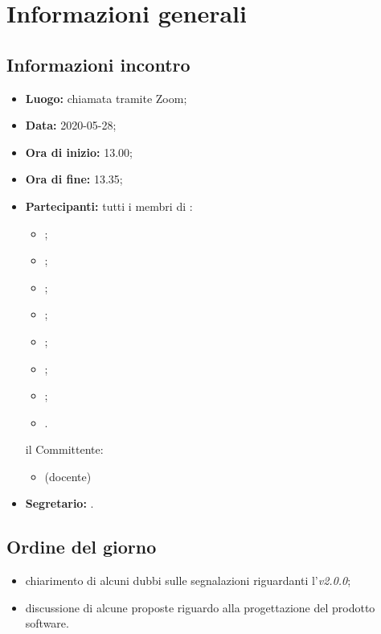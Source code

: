 \section{Informazioni generali}
\subsection{Informazioni incontro}
\begin{itemize}
	\item \textbf{Luogo:} chiamata tramite Zoom;
	\item \textbf{Data:} 2020-05-28;
	\item \textbf{Ora di inizio:} 13.00;
	\item \textbf{Ora di fine:} 13.35;
	\item \textbf{Partecipanti:}
		tutti i membri di \Gruppo:
		\begin{itemize}
			\item \VB;
			\item \LB;
			\item \NF;
			\item \EG;
			\item \FJ;
			\item \MP;
			\item \AS;
			\item \AZ.
		\end{itemize}
		il Committente:
		\begin{itemize}
			\item \RC{} (docente)
		\end{itemize}
	\item \textbf{Segretario:} \MP.
\end{itemize}

\subsection{Ordine del giorno}
\begin{itemize}
	\item chiarimento di alcuni dubbi sulle segnalazioni riguardanti l'\AdR{}\textit{v2.0.0};
	\item discussione di alcune proposte riguardo alla progettazione del prodotto software.
\end{itemize}
